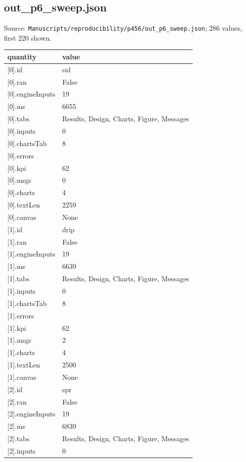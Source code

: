 \subsection*{out\_p6\_sweep.json}
\noindent\small Source: \nolinkurl{Manuscripts/reproducibility/p456/out_p6_sweep.json}; 286 values, first 220 shown.\par
{\scriptsize\begin{longtable}{p{}p{}}\toprule\textbf{quantity} & \textbf{value}\\\midrule\endhead
{}[0].id & sid\\
{}[0].ran & False\\
{}[0].engineInputs & 19\\
{}[0].ms & 6655\\
{}[0].tabs & Results, Design, Charts, Figure, Messages\\
{}[0].inputs & 0\\
{}[0].chartsTab & 8\\
{}[0].errors & \\
{}[0].kpi & 62\\
{}[0].msgs & 0\\
{}[0].charts & 4\\
{}[0].textLen & 2259\\
{}[0].canvas & None\\
{}[1].id & drip\\
{}[1].ran & False\\
{}[1].engineInputs & 19\\
{}[1].ms & 6639\\
{}[1].tabs & Results, Design, Charts, Figure, Messages\\
{}[1].inputs & 0\\
{}[1].chartsTab & 8\\
{}[1].errors & \\
{}[1].kpi & 62\\
{}[1].msgs & 2\\
{}[1].charts & 4\\
{}[1].textLen & 2500\\
{}[1].canvas & None\\
{}[2].id & spr\\
{}[2].ran & False\\
{}[2].engineInputs & 19\\
{}[2].ms & 6839\\
{}[2].tabs & Results, Design, Charts, Figure, Messages\\
{}[2].inputs & 0\\

\end{longtable}}
